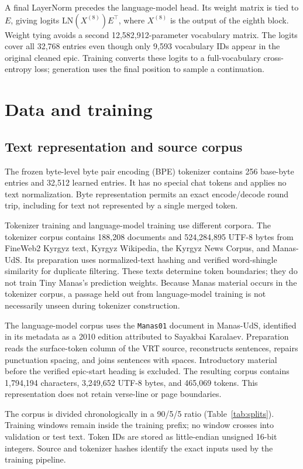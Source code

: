 \documentclass{article}
\newcommand{\code}[1]{\texttt{#1}}
\begin{document}
A final LayerNorm precedes the language-model head. Its weight matrix is tied to $E$, giving logits $\mathrm{LN}(X^{(8)})E^\top$, where $X^{(8)}$ is the output of the eighth block. Weight tying avoids a second 12,582,912-parameter vocabulary matrix. The logits cover all 32,768 entries even though only 9,593 vocabulary IDs appear in the original cleaned epic. Training converts these logits to a full-vocabulary cross-entropy loss; generation uses the final position to sample a continuation.

\section{Data and training}
\label{sec:data}
\subsection{Text representation and source corpus}
The frozen byte-level byte pair encoding (BPE) tokenizer contains 256 base-byte entries and 32,512 learned entries. It has no special chat tokens and applies no text normalization. Byte representation permits an exact encode/decode round trip, including for text not represented by a single merged token.

Tokenizer training and language-model training use different corpora. The tokenizer corpus contains 188,208 documents and 524,284,895 UTF-8 bytes from FineWeb2 Kyrgyz text, Kyrgyz Wikipedia, the Kyrgyz News Corpus, and Manas-UdS. Its preparation uses normalized-text hashing and verified word-shingle similarity for duplicate filtering. These texts determine token boundaries; they do not train Tiny Manas's prediction weights. Because Manas material occurs in the tokenizer corpus, a passage held out from language-model training is not necessarily unseen during tokenizer construction.

The language-model corpus uses the \code{Manas01} document in Manas-UdS, identified in its metadata as a 2010 edition attributed to Sayakbai Karalaev. Preparation reads the surface-token column of the VRT source, reconstructs sentences, repairs punctuation spacing, and joins sentences with spaces. Introductory material before the verified epic-start heading is excluded. The resulting corpus contains 1,794,194 characters, 3,249,652 UTF-8 bytes, and 465,069 tokens. This representation does not retain verse-line or page boundaries.

The corpus is divided chronologically in a 90/5/5 ratio (Table~\ref{tab:splits}). Training windows remain inside the training prefix; no window crosses into validation or test text. Token IDs are stored as little-endian unsigned 16-bit integers. Source and tokenizer hashes identify the exact inputs used by the training pipeline.
\end{document}
